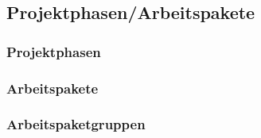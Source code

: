 \subsection{Projektphasen/Arbeitspakete}
\subsubsection{Projektphasen}

\subsubsection{Arbeitspakete}

\subsubsection{Arbeitspaketgruppen}